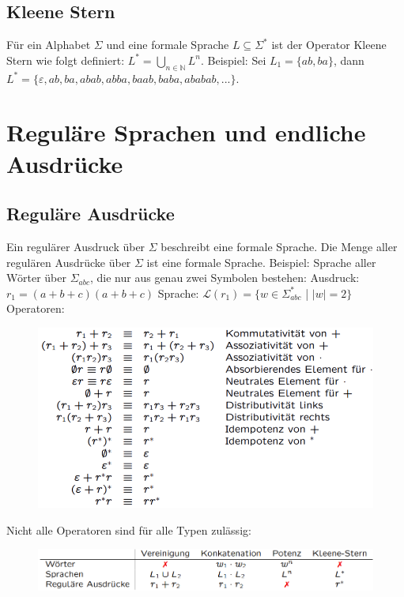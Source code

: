 \documentclass[12pt,a4paper]{article}
\begin{document}
	\subsection{Kleene Stern}
	Für ein Alphabet $\varSigma$ und eine formale Sprache $L \subseteq \varSigma^*$ ist der Operator Kleene Stern wie folgt definiert: $L^* = \underset{n \in \mathbb{N}}{\bigcup} L^n$.\newline \newline
	Beispiel: Sei $L_1 = \{ ab, ba\}$, dann $L^* = \{\varepsilon, ab, ba, abab, abba, baab, baba, ababab, ...\}$.


\section{Reguläre Sprachen und endliche Ausdrücke}
	\subsection{Reguläre Ausdrücke}
	Ein regulärer Ausdruck über $\varSigma$ beschreibt eine formale Sprache.\newline
	Die Menge aller regulären Ausdrücke über $\varSigma$ ist eine formale Sprache.\newline\newline
	Beispiel: Sprache aller Wörter über $\varSigma_{abc}$, die nur aus genau zwei Symbolen bestehen:\newline
	Ausdruck: $r_1 = (a + b + c)(a + b + c)$\newline
	Sprache: $\mathcal{L}(r_1) = \{ w \in \varSigma_{abc}^*$ | $|w| = 2\}$\newline
	\noindent Operatoren:
	\begin{center}
		\begin{figure}[!h]
			\includegraphics[width=\textwidth]{Bilder/RegulaereAusdruecke_Operatoren.PNG}
		\end{figure}
	\end{center}
	Nicht alle Operatoren sind für alle Typen zulässig:
	\begin{center}
		\begin{figure}[!h]
			\includegraphics[width=\textwidth]{Bilder/Zulaessige_Operatoren.PNG}
		\end{figure}
	\end{center}
\end{document}
